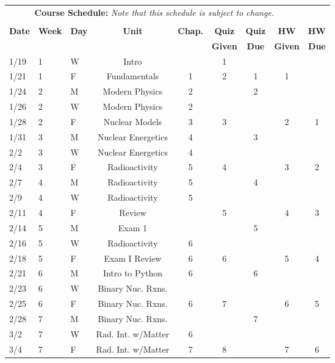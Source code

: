 \documentclass[11pt, a4paper]{article}
\begin{document}
\pagebreak
\FloatBarrier
\renewcommand{\arraystretch}{1}
\begin{table}[h]
\begin{center}
\begin{tabular}{lllcccccc}
\multicolumn{8}{c}{\textbf{Course Schedule:}\textit{ Note that this schedule is
subject to change.}}\\
&&&&&&&&\\
\textbf{Date} & \textbf{Week} & \textbf{Day} & \textbf{Unit} & \textbf{Chap.} & \textbf{Quiz}& \textbf{Quiz} & \textbf{HW} & \textbf{HW}\\
              &  &  &  &  & \textbf{Given} & \textbf{Due} & \textbf{Given} & \textbf{Due}\\ \hline
\hline
1/19 & 1 & W & Intro              &  & 1 &  &  & \\
1/21 & 1 & F & Fundamentals       & 1 & 2 & 1 & 1 &  \\
1/24 & 2 & M & Modern Physics     & 2 &   & 2 & &  \\
1/26 & 2 & W & Modern Physics     & 2 &   &  &  &  \\
1/28 & 2 & F & Nuclear Models     & 3 & 3 &  & 2 & 1  \\
1/31 & 3 & M & Nuclear Energetics & 4 &   & 3 & &  \\
2/2 & 3 & W & Nuclear Energetics  & 4 &   &  &  &  \\
2/4 & 3 & F & Radioactivity       & 5 & 4 &  & 3 & 2 \\
2/7 & 4 & M & Radioactivity       & 5 &   & 4 &  &  \\
2/9 & 4 & W & Radioactivity       & 5 &   &  &  &  \\
2/11 & 4 & F & Review             &   & 5 &  & 4 & 3 \\
2/14 & 5 & M & Exam 1             &   &   & 5  &  &  \\
2/16 & 5 & W & Radioactivity  & 6 &   &  &  &  \\
2/18 & 5 & F & Exam I Review  & 6 & 6 &  & 5 & 4 \\
2/21 & 6 & M & Intro to Python  & 6 &   & 6 &  &  \\
2/23 & 6 & W & Binary Nuc. Rxns.      &  &  &  &  &  \\
2/25 & 6 & F & Binary Nuc. Rxns.  & 6 & 7 &  & 6 & 5  \\
2/28 & 7 & M & Binary Nuc. Rxns. &  &  & 7 &  &  \\
3/2 & 7 & W & Rad. Int. w/Matter  & 6 &  &  &  &  \\
3/4 & 7 & F & Rad. Int. w/Matter  & 7 & 8 &  & 7 & 6 \\

\end{tabular}
\end{center}
\end{table}
\end{document}
